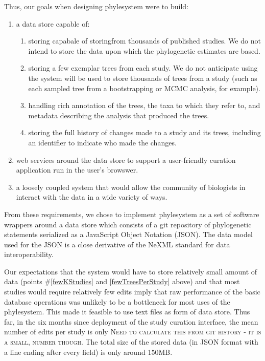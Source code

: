 \documentclass{bioinfo}
\newcommand{\ps}{phylesystem\xspace}
\newcommand{\js}{JavaScript\xspace}
\newcommand{\mthcomment}[1]{{\color{red} \textsc{#1}}\xspace}
\begin{document}
Thus, our goals when designing \ps were to build: 
\begin{enumerate}
    \item  a data store capable of:
        \begin{enumerate}
            \item \label{fewKStudies} storing capabale of storingfrom thousands of published studies. We do not intend to store the 
                data upon which the phylogenetic estimates are based.
            \item \label{fewTreesPerStudy} storing a few exemplar trees from each study. We do not anticipate using the system will be used 
                to store thousands of trees from 
                a study (such as each sampled tree from a bootstrapping or MCMC analysis, for example).
            \item \label{richAnnot} handling rich annotation of the trees, the taxa to which they refer to, and metadata describing 
                the analysis that produced the trees.
            \item \label{history} storing the full history of changes made to a study and its trees,
                including an identifier to indicate who made the changes.
        \end{enumerate}
    \item \label{ws} web services around the data store to support a user-friendly curation application run in the user's browswer.
    \item \label{looseOpen} a loosely coupled system that would allow the community of biologists in interact with the data in a wide variety of ways.
\end{enumerate}
From these requirements, we chose to implement \ps as a set of software wrappers around a data store
    which consists of a git \citep{git} repository of phylogenetic statements serialized as a \js Object Notation (JSON).
The data model used for the JSON is a close derivative of the NeXML standard for data interoperability\citep{NeXML}.

Our expectations that the system would have to store relatively small amount of data 
    (points \#\ref{fewKStudies} and \ref{fewTreesPerStudy} above) and that most
    studies would require relatively few edits imply that
    raw performance of the basic database operations was unlikely to be a bottleneck for most
    uses of the \ps.
This made it feasible to use text files as form of data store.
Thus far, in the six months since deployment of the study curation interface, the mean number of edits 
    per study is only \mthcomment{Need to calculate this from git history - it is a small, number though}.
The total size of the stored data (in JSON format with a line ending after 
    every field) is only around 150MB.
\end{document}
